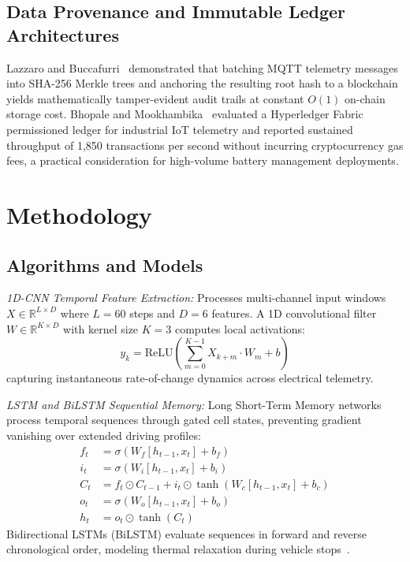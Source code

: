 \documentclass[conference]{IEEEtran}
\begin{document}
\subsection{Data Provenance and Immutable Ledger Architectures}

Lazzaro and Buccafurri~\cite{lazzaro2024achieving} demonstrated that batching MQTT telemetry messages into SHA-256 Merkle trees and anchoring the resulting root hash to a blockchain yields mathematically tamper-evident audit trails at constant $O(1)$ on-chain storage cost. Bhopale and Mookhambika~\cite{bhopale2024ensuring} evaluated a Hyperledger Fabric permissioned ledger for industrial IoT telemetry and reported sustained throughput of 1,850 transactions per second without incurring cryptocurrency gas fees, a practical consideration for high-volume battery management deployments.

\section{Methodology}
\subsection{Algorithms and Models}
\textit{1D-CNN Temporal Feature Extraction:} Processes multi-channel input windows $X \in \mathbb{R}^{L \times D}$ where $L=60$ steps and $D=6$ features. A 1D convolutional filter $W \in \mathbb{R}^{K \times D}$ with kernel size $K=3$ computes local activations:
\begin{equation}
y_k = \text{ReLU} \left( \sum_{m=0}^{K-1} X_{k+m} \cdot W_m + b \right)
\end{equation}
capturing instantaneous rate-of-change dynamics across electrical telemetry.

\textit{LSTM and BiLSTM Sequential Memory:} Long Short-Term Memory networks process temporal sequences through gated cell states, preventing gradient vanishing over extended driving profiles:
\begin{align}
f_t &= \sigma(W_f [h_{t-1}, x_t] + b_f) \\
i_t &= \sigma(W_i [h_{t-1}, x_t] + b_i) \\
C_t &= f_t \odot C_{t-1} + i_t \odot \tanh(W_c [h_{t-1}, x_t] + b_c) \\
o_t &= \sigma(W_o [h_{t-1}, x_t] + b_o) \\
h_t &= o_t \odot \tanh(C_t)
\end{align}
Bidirectional LSTMs (BiLSTM) evaluate sequences in forward and reverse chronological order, modeling thermal relaxation during vehicle stops~\cite{zhao2024online, wang2025lithium}.
\end{document}
